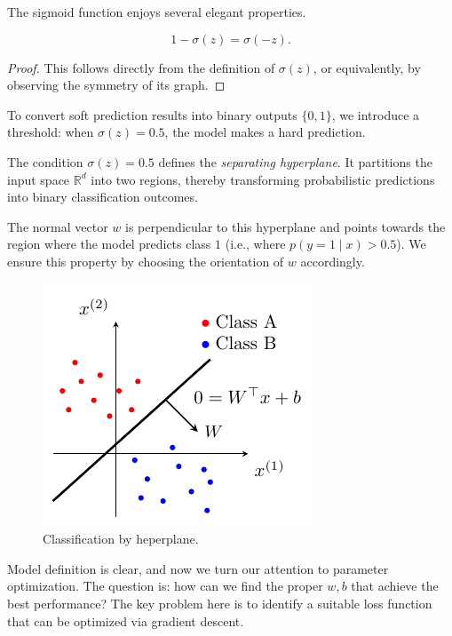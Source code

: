 \documentclass[../main]{subfiles}
\begin{document}
The sigmoid function enjoys several elegant properties.

\begin{theorem}
\[
1 - \sigma(z) = \sigma(-z) .
\]
\end{theorem}

\begin{proof}
This follows directly from the definition of $\sigma(z)$, or equivalently, by observing the symmetry of its graph.
\end{proof}

To convert soft prediction results into binary outputs $\{0,1\}$, we introduce a threshold: when $\sigma(z) = 0.5$, the model makes a hard prediction.

\begin{definition}
The condition $\sigma(z) = 0.5$ defines the \emph{separating hyperplane}. It partitions the input space $\mathbb{R}^d$ into two regions, thereby transforming probabilistic predictions into binary classification outcomes.
\end{definition}
The normal vector $w$ is perpendicular to this hyperplane and points towards the region where the model predicts class $1$ 
(i.e., where $p(y=1 \mid x) > 0.5$). 
We ensure this property by choosing the orientation of $w$ accordingly.
\begin{figure}[H]
  \centering
  \includegraphics{../../tikz/2/2.pdf}
  \caption{Classification by heperplane.}
  \label{2-lr}
\end{figure}


Model definition is clear, and now we turn our attention to parameter optimization. 
The question is: how can we find the proper $w, b$ that achieve the best performance? 
The key problem here is to identify a suitable loss function that can be optimized via gradient descent.
\end{document}

